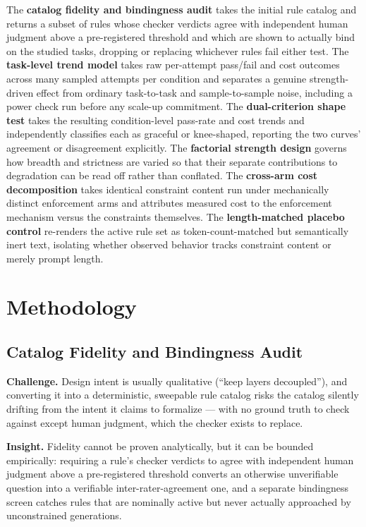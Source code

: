\documentclass[11pt]{article}
\begin{document}
The \textbf{catalog fidelity and bindingness audit} takes the initial rule catalog and returns a subset of rules whose checker verdicts agree with independent human judgment above a pre-registered threshold and which are shown to actually bind on the studied tasks, dropping or replacing whichever rules fail either test. The \textbf{task-level trend model} takes raw per-attempt pass/fail and cost outcomes across many sampled attempts per condition and separates a genuine strength-driven effect from ordinary task-to-task and sample-to-sample noise, including a power check run before any scale-up commitment. The \textbf{dual-criterion shape test} takes the resulting condition-level pass-rate and cost trends and independently classifies each as graceful or knee-shaped, reporting the two curves' agreement or disagreement explicitly. The \textbf{factorial strength design} governs how breadth and strictness are varied so that their separate contributions to degradation can be read off rather than conflated. The \textbf{cross-arm cost decomposition} takes identical constraint content run under mechanically distinct enforcement arms and attributes measured cost to the enforcement mechanism versus the constraints themselves. The \textbf{length-matched placebo control} re-renders the active rule set as token-count-matched but semantically inert text, isolating whether observed behavior tracks constraint content or merely prompt length.

\section{Methodology}

\subsection{Catalog Fidelity and Bindingness Audit}
\textbf{Challenge.} Design intent is usually qualitative (``keep layers decoupled''), and converting it into a deterministic, sweepable rule catalog risks the catalog silently drifting from the intent it claims to formalize --- with no ground truth to check against except human judgment, which the checker exists to replace.

\textbf{Insight.} Fidelity cannot be proven analytically, but it can be bounded empirically: requiring a rule's checker verdicts to agree with independent human judgment above a pre-registered threshold converts an otherwise unverifiable question into a verifiable inter-rater-agreement one, and a separate bindingness screen catches rules that are nominally active but never actually approached by unconstrained generations.
\end{document}
